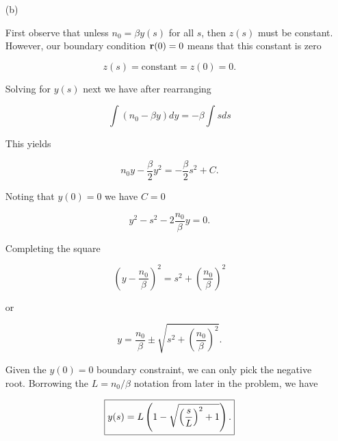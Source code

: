 {\begin{enumerate}
We have two non-trivial differential equations to solve.

\item[(b)]

First observe that unless $n_0 = \beta y(s)$ for all $s$, then $z(s)$ must be constant.  However, our boundary condition $\mathbf{r}(0) = 0$ means that this constant is zero

\begin{equation}\label{eqn:modernOpticsProblemSet1P2:110}
z(s) = \text{constant} = z(0) = 0.
\end{equation}

Solving for $y(s)$ next we have after rearranging

\begin{dmath}\label{eqn:modernOpticsProblemSet1P2:130}
\int \left( n_0 - \beta y \right) dy = -\beta \int s ds
\end{dmath}

This yields

\begin{dmath}\label{eqn:modernOpticsProblemSet1P2:150}
n_0 y - \frac{\beta}{2} y^2 = -\frac{\beta}{2} s^2 + C.
\end{dmath}

Noting that $y(0) = 0$ we have $C = 0$

\begin{dmath}\label{eqn:modernOpticsProblemSet1P2:170}
y^2 - s^2 - 2 \frac{n_0}{\beta} y = 0.
\end{dmath}

Completing the square

\begin{dmath}\label{eqn:modernOpticsProblemSet1P2:230}
\left( y - \frac{n_0}{\beta} \right)^2 = s^2 + \left( \frac{n_0}{\beta} \right)^2 
\end{dmath}

or

\begin{dmath}\label{eqn:modernOpticsProblemSet1P2:190}
y = \frac{n_0}{\beta} \pm \sqrt{ s^2 + \left( \frac{n_0}{\beta} \right)^2 }.
\end{dmath}

Given the $y(0) = 0$ boundary constraint, we can only pick the negative root.  Borrowing the $L = n_0/\beta$ notation from later in the problem, we have

\begin{dmath}\label{eqn:modernOpticsProblemSet1P2:210}
\boxed{
y(s) = L \left( 1 - \sqrt{ \left( \frac{s}{L}\right)^2 + 1 } \right) .
}
\end{dmath}


\end{enumerate}}
